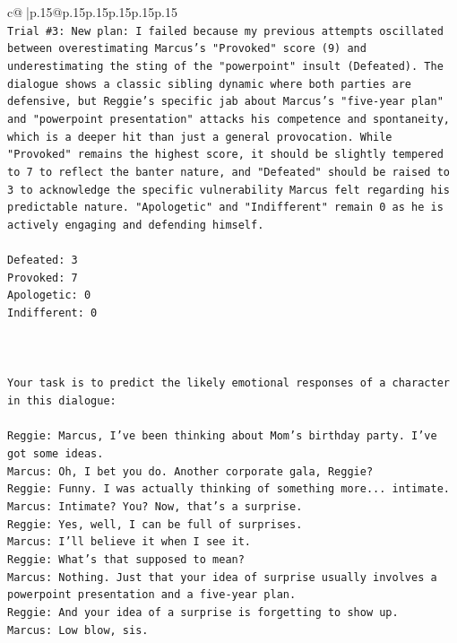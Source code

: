 \documentclass{article}
\begin{document}
{\begin{supertabular}{c@{$\;$}|p{.15\linewidth}@{}p{.15\linewidth}p{.15\linewidth}p{.15\linewidth}p{.15\linewidth}p{.15\linewidth}}
{{{\\ 
\texttt{Trial \#3: New plan: I failed because my previous attempts oscillated between overestimating Marcus's "Provoked" score (9) and underestimating the sting of the "powerpoint" insult (Defeated). The dialogue shows a classic sibling dynamic where both parties are defensive, but Reggie's specific jab about Marcus's "five{-}year plan" and "powerpoint presentation" attacks his competence and spontaneity, which is a deeper hit than just a general provocation. While "Provoked" remains the highest score, it should be slightly tempered to 7 to reflect the banter nature, and "Defeated" should be raised to 3 to acknowledge the specific vulnerability Marcus felt regarding his predictable nature. "Apologetic" and "Indifferent" remain 0 as he is actively engaging and defending himself.} \\
\\ 
\texttt{Defeated: 3} \\
\texttt{Provoked: 7} \\
\texttt{Apologetic: 0} \\
\texttt{Indifferent: 0} \\
\\ 
\\ 
\\ 
\texttt{Your task is to predict the likely emotional responses of a character in this dialogue:} \\
\\ 
\texttt{Reggie: Marcus, I've been thinking about Mom's birthday party. I've got some ideas.} \\
\texttt{Marcus: Oh, I bet you do. Another corporate gala, Reggie? } \\
\texttt{Reggie: Funny. I was actually thinking of something more... intimate. } \\
\texttt{Marcus: Intimate? You? Now, that's a surprise.} \\
\texttt{Reggie: Yes, well, I can be full of surprises. } \\
\texttt{Marcus: I'll believe it when I see it. } \\
\texttt{Reggie: What's that supposed to mean? } \\
\texttt{Marcus: Nothing. Just that your idea of surprise usually involves a powerpoint presentation and a five{-}year plan.} \\
\texttt{Reggie: And your idea of a surprise is forgetting to show up. } \\
\texttt{Marcus: Low blow, sis. } \\
}}}
\end{supertabular}}
\end{document}
